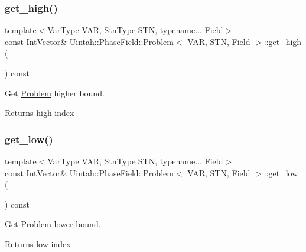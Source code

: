 \subsubsection{\texorpdfstring{get\+\_\+high()}{get\_high()}}
{\footnotesize\ttfamily template$<$Var\+Type V\+AR, Stn\+Type S\+TN, typename... Field$>$ \\
const Int\+Vector\& \hyperlink{classUintah_1_1PhaseField_1_1Problem}{Uintah\+::\+Phase\+Field\+::\+Problem}$<$ V\+AR, S\+TN, Field $>$\+::get\+\_\+high (\begin{DoxyParamCaption}{ }\end{DoxyParamCaption}) const\hspace{0.3cm}{\ttfamily [inline]}}



Get \hyperlink{classUintah_1_1PhaseField_1_1Problem}{Problem} higher bound. 

\begin{DoxyReturn}{Returns}
high index 
\end{DoxyReturn}
\mbox{\label{classUintah_1_1PhaseField_1_1Problem_a2e415a1743c4eba4f4dc9c09c9c87422}} 
\subsubsection{\texorpdfstring{get\+\_\+low()}{get\_low()}}
{\footnotesize\ttfamily template$<$Var\+Type V\+AR, Stn\+Type S\+TN, typename... Field$>$ \\
const Int\+Vector\& \hyperlink{classUintah_1_1PhaseField_1_1Problem}{Uintah\+::\+Phase\+Field\+::\+Problem}$<$ V\+AR, S\+TN, Field $>$\+::get\+\_\+low (\begin{DoxyParamCaption}{ }\end{DoxyParamCaption}) const\hspace{0.3cm}{\ttfamily [inline]}}



Get \hyperlink{classUintah_1_1PhaseField_1_1Problem}{Problem} lower bound. 

\begin{DoxyReturn}{Returns}
low index 
\end{DoxyReturn}
\mbox{\label{classUintah_1_1PhaseField_1_1Problem_a33f052fe4dd33891633a479b82e0bea0}} 
